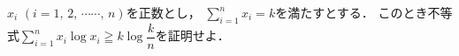 \documentclass[../../main.tex]{subfiles}
\begin{document}
$x_i$ $(i=1, \, 2, \, \cdots\cdots, \, n)$を正数とし，
$\displaystyle\sum_{i=1}^nx_i=k$を満たすとする．
このとき不等式$\displaystyle\sum_{i=1}^nx_i\log x_i \geqq k\log\dfrac{k}{n}$を証明せよ．
\end{document}
